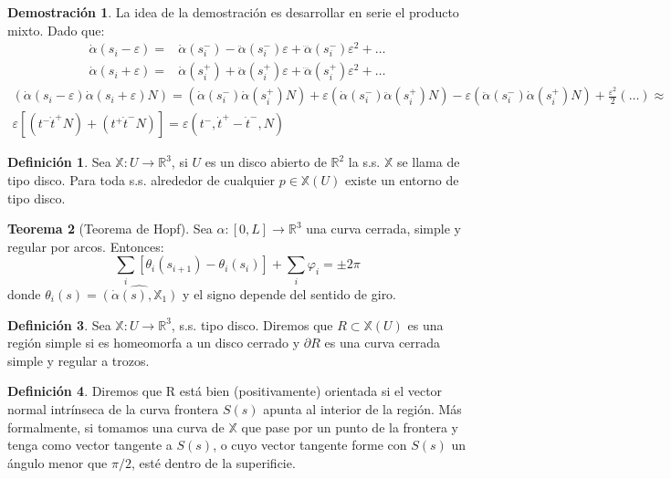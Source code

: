 \documentclass[twoside]{report}
\theoremstyle{definition}
\newtheorem{theorem}{Teorema}[section]
\newtheorem{defi}[theorem]{Definición}
\newtheorem*{dem}{Demostración}
\numberwithin{equation}{section}
\newcommand{\R}{\mathbb{R}}
\newcommand{\X}{\mathbb{X}}
\newcommand{\seaX}{\X:U\rightarrow\R^3}
\begin{document}
\begin{dem}
La idea de la demostración es desarrollar en serie el producto mixto. Dado que:
\begin{align*}
\dot{\alpha}(s_i-\varepsilon) = & \dot{\alpha}(s_i^-) - \ddot{\alpha}(s_i^-)\varepsilon + \dddot{\alpha}(s_i^-)\varepsilon^2 + \dotsc\\
\dot{\alpha}(s_i+\varepsilon) = & \dot{\alpha}(s_i^+) + \ddot{\alpha}(s_i^+)\varepsilon + \dddot{\alpha}(s_i^+)\varepsilon^2 + \dotsc
\end{align*}
\begin{gather*}
(\dot{\alpha}(s_i -\varepsilon) \dot{\alpha}(s_i+\varepsilon) N) = (\dot{\alpha}(s_i^-) \dot{\alpha}(s_i^+)  N) + \varepsilon (\dot{\alpha}(s_i^-) \ddot{\alpha}(s_i^+)  N) - \varepsilon(\ddot{\alpha}(s_i^-) \dot{\alpha}(s_i^+)  N) + \frac{\varepsilon^2}{2}(\dotsc) \approx\\
\varepsilon[(t^- \dot{t}^+N) + (t^+\dot{t}^-N)] = \varepsilon(t^-,\dot{t}^+ - \dot{t}^- , N)
\end{gather*}
\end{dem}
\begin{defi}
Sea $\X:U\rightarrow\R^3$, si $U$ es un disco abierto de $\R^2$ la s.s. $\X$ se llama de tipo disco. Para toda s.s. alrededor de cualquier $p\in\X(U)$ existe un entorno de tipo disco.
\end{defi}
\begin{theorem}[Teorema de Hopf] Sea $\alpha:[0,L]\rightarrow\R^3$ una curva cerrada, simple y regular por arcos. Entonces:
\[
\sum_i [\theta_i(s_{i+1})-\theta_i(s_i)] + \sum_i \varphi_i = \pm 2\pi
\]
donde $\theta_i(s) =\widehat{(\dot{\alpha}(s),\mathbb{X}_1)}$ y el signo depende del sentido de giro. 
\end{theorem}
\begin{defi}
Sea $\seaX$, s.s. tipo disco. Diremos que $R \subset \X(U)$ es una región simple si es homeomorfa a un disco cerrado y $\partial R$ es una curva cerrada simple y regular a trozos.
\end{defi}
\begin{defi}
Diremos que R está bien (positivamente) orientada si el vector normal intrínseca de la curva frontera $S(s)$ apunta al interior de la región. Más formalmente, si tomamos una curva de $\X$ que pase por un punto de la frontera y tenga como vector tangente a $S(s)$, o cuyo vector tangente forme con $S(s)$ un ángulo menor que $\pi/2$, esté dentro de la superificie.
\end{defi}
\end{document}
